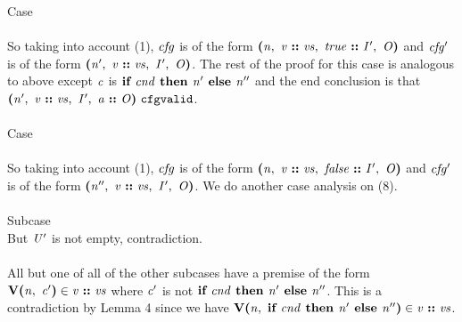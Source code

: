 \documentclass[12pt]{article}
\begin{document}
Case
\\
\\

So taking into account (1), $\mathit{cfg}$ is of the form
$\textbf{(}\mathit{n},\ \mathit{v}\ \textbf{::}\ \mathit{vs},\ \mathit{true}\ \textbf{::}\ \mathit{I'},\ \mathit{O}\textbf{)}$
and $\mathit{cfg'}$ is of the form
$\textbf{(}\mathit{n'},\ \mathit{v}\ \textbf{::}\ \mathit{vs},\ \mathit{I'},\ \mathit{O}\textbf{)}$.
The rest of the proof for this case is analogous to above except $\mathit{c}$ is
$\textbf{if }\mathit{cnd}\textbf{ then }\mathit{n'}\textbf{ else }\mathit{n''}$ and the end conclusion is that
$\textbf{(}\mathit{n'},\ \mathit{v}\ \textbf{::}\ \mathit{vs},\ \mathit{I'},\ \mathit{a}\ \textbf{::}\ \mathit{O}\textbf{)}\ \mathtt{cfgvalid}$.\\
\\

Case
\\
\\

So taking into account (1), $\mathit{cfg}$ is of the form
$\textbf{(}\mathit{n},\ \mathit{v}\ \textbf{::}\ \mathit{vs},\ \mathit{false}\ \textbf{::}\ \mathit{I'},\ \mathit{O}\textbf{)}$
and $\mathit{cfg'}$ is of the form
$\textbf{(}\mathit{n''},\ \mathit{v}\ \textbf{::}\ \mathit{vs},\ \mathit{I'},\ \mathit{O}\textbf{)}$. We do
another case analysis on (8).\\
\\

Subcase
\\

But $\mathit{U'}$ is not empty, contradiction.\\
\\

All but one of all of the other subcases have a premise of the form
$\textbf{V(}\mathit{n},\ \mathit{c'}\textbf{)} \in \mathit{v}\ \textbf{::}\ \mathit{vs}$ where
$\mathit{c'}$ is not $\textbf{if }\mathit{cnd}\textbf{ then }\mathit{n'}\textbf{ else }\mathit{n''}$. This is a
contradiction by Lemma 4 since we have
$\textbf{V(}\mathit{n},\ \textbf{if }\mathit{cnd}\textbf{ then }\mathit{n'}\textbf{ else }\mathit{n''}\textbf{)} \in
\mathit{v}\ \textbf{::}\ \mathit{vs}$.\\
\\
\end{document}

